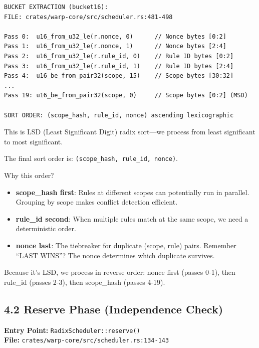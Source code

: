 \documentclass[11pt]{book}
\newenvironment{directors}
{\begin{mdframed}[
  linecolor=blue!60,
  linewidth=2pt,
  leftline=true,
  rightline=false,
  topline=false,
  bottomline=false,
  backgroundcolor=blue!3,
  innerleftmargin=12pt,
  innerrightmargin=10pt,
  innertopmargin=8pt,
  innerbottommargin=8pt,
  skipabove=12pt,
  skipbelow=12pt
]\small\sffamily\color{blue!70!black}}
{\end{mdframed}}
\begin{document}
\begin{verbatim}
BUCKET EXTRACTION (bucket16):
FILE: crates/warp-core/src/scheduler.rs:481-498

Pass 0:  u16_from_u32_le(r.nonce, 0)      // Nonce bytes [0:2]
Pass 1:  u16_from_u32_le(r.nonce, 1)      // Nonce bytes [2:4]
Pass 2:  u16_from_u32_le(r.rule_id, 0)    // Rule ID bytes [0:2]
Pass 3:  u16_from_u32_le(r.rule_id, 1)    // Rule ID bytes [2:4]
Pass 4:  u16_be_from_pair32(scope, 15)    // Scope bytes [30:32]
...
Pass 19: u16_be_from_pair32(scope, 0)     // Scope bytes [0:2] (MSD)

SORT ORDER: (scope_hash, rule_id, nonce) ascending lexicographic
\end{verbatim}

\begin{directors}
This is LSD (Least Significant Digit) radix sort---we process from least significant to most significant.

The final sort order is: \texttt{(scope\_hash, rule\_id, nonce)}.

Why this order?
\begin{itemize}
\item \textbf{scope\_hash first}: Rules at different scopes can potentially run in parallel. Grouping by scope makes conflict detection efficient.
\item \textbf{rule\_id second}: When multiple rules match at the same scope, we need a deterministic order.
\item \textbf{nonce last}: The tiebreaker for duplicate (scope, rule) pairs. Remember ``LAST WINS''? The nonce determines which duplicate survives.
\end{itemize}

Because it's LSD, we process in reverse order: nonce first (passes 0-1), then rule\_id (passes 2-3), then scope\_hash (passes 4-19).
\end{directors}

\subsection{4.2 Reserve Phase (Independence Check)}

\textbf{Entry Point:} \texttt{RadixScheduler::reserve()} \\
\textbf{File:} \texttt{crates/warp-core/src/scheduler.rs:134-143}
\end{document}
